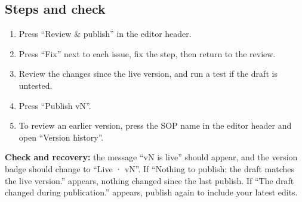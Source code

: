 \subsection{Steps and check}
\begin{enumerate}
\item Press “Review \& publish” in the editor header.
\item Press “Fix” next to each issue, fix the step, then return to the review.
\item Review the changes since the live version, and run a test if the draft is untested.
\item Press “Publish vN”.
\item To review an earlier version, press the SOP name in the editor header and open “Version history”.
\end{enumerate}

\textbf{Check and recovery:} the message “vN is live” should appear, and the version badge should change to “Live · vN”. If “Nothing to publish: the draft matches the live version.” appears, nothing changed since the last publish. If “The draft changed during publication.” appears, publish again to include your latest edits.
